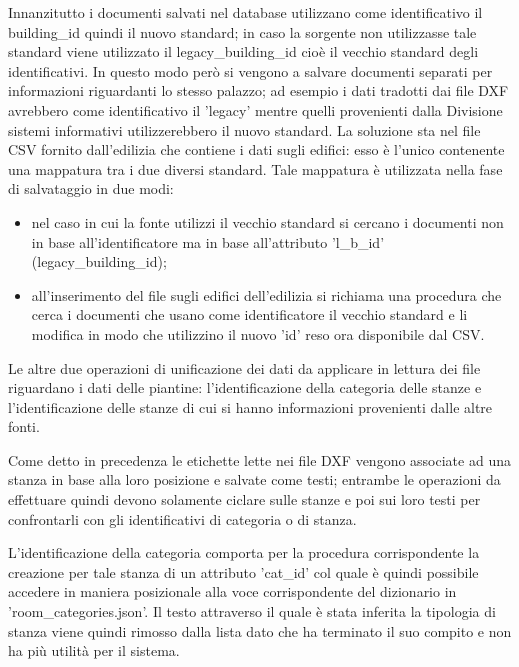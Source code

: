 \documentclass[12pt]{report}
\begin{document}
Innanzitutto i documenti salvati nel database utilizzano come identificativo il building\_id quindi il nuovo standard; in caso la sorgente non utilizzasse tale standard viene utilizzato il legacy\_building\_id cioè il vecchio standard degli identificativi.
In questo modo però si vengono a salvare documenti separati per informazioni riguardanti lo stesso palazzo; ad esempio i dati tradotti dai file DXF avrebbero come identificativo il 'legacy' mentre quelli provenienti dalla Divisione sistemi informativi utilizzerebbero il nuovo standard.
La soluzione sta nel file CSV fornito dall'edilizia che contiene i dati sugli edifici: esso è l'unico contenente una mappatura tra i due diversi standard.
Tale mappatura è utilizzata nella fase di salvataggio in due modi:
\begin{itemize}
\item nel caso in cui la fonte utilizzi il vecchio standard si cercano i documenti non in base all'identificatore ma in base all'attributo 'l\_b\_id' (legacy\_building\_id);
\item all'inserimento del file sugli edifici dell'edilizia si richiama una procedura che cerca i documenti che usano come identificatore il vecchio standard e li modifica in modo che utilizzino il nuovo 'id' reso ora disponibile dal CSV. 
\end{itemize} 

\vspace{5mm} %

Le altre due operazioni di unificazione dei dati da applicare in lettura dei file riguardano i dati delle piantine: l'identificazione della categoria delle stanze e l'identificazione delle stanze di cui si hanno informazioni provenienti dalle altre fonti.

Come detto in precedenza le etichette lette nei file DXF vengono associate ad una stanza in base alla loro posizione e salvate come testi; entrambe le operazioni da effettuare quindi devono solamente ciclare sulle stanze e poi sui loro testi per confrontarli con gli identificativi di categoria o di stanza.

L'identificazione della categoria comporta per la procedura corrispondente la creazione per tale stanza di un attributo 'cat\_id' col quale è quindi possibile accedere in maniera posizionale alla voce corrispondente del dizionario in 'room\_categories.json'. 
Il testo attraverso il quale è stata inferita la tipologia di stanza viene quindi rimosso dalla lista dato che ha terminato il suo compito e non ha più utilità per il sistema.
\end{document}
